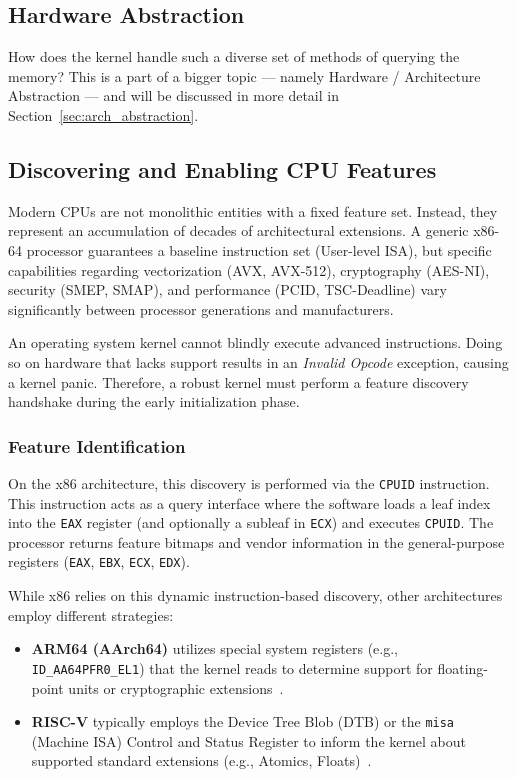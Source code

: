 \documentclass[a4paper,10pt,twoside]{report}
\theoremstyle{definition}
\begin{document}
\subsection{Hardware Abstraction}
How does the kernel handle such a diverse set of methods of querying the memory? This is a part of a bigger topic --- namely Hardware / Architecture Abstraction --- and will be discussed in more detail in Section~\ref{sec:arch_abstraction}.

\subsection{Discovering and Enabling CPU Features}
\label{subsec:cpu_discovery}

Modern CPUs are not monolithic entities with a fixed feature set. Instead, they represent an accumulation of decades of architectural extensions. A generic x86-64 processor guarantees a baseline instruction set (User-level ISA), but specific capabilities regarding vectorization (AVX, AVX-512), cryptography (AES-NI), security (SMEP, SMAP), and performance (PCID, TSC-Deadline) vary significantly between processor generations and manufacturers.
\cite{Intel-AVX}

An operating system kernel cannot blindly execute advanced instructions. Doing so on hardware that lacks support results in an \textit{Invalid Opcode} exception, causing a kernel panic. Therefore, a robust kernel must perform a feature discovery handshake during the early initialization phase.

\subsubsection{Feature Identification}
On the x86 architecture, this discovery is performed via the \texttt{CPUID} instruction. This instruction acts as a query interface where the software loads a leaf index into the \texttt{EAX} register (and optionally a subleaf in \texttt{ECX}) and executes \texttt{CPUID}. The processor returns feature bitmaps and vendor information in the general-purpose registers (\texttt{EAX}, \texttt{EBX}, \texttt{ECX}, \texttt{EDX}).
\cite{Intel-CPUID}

While x86 relies on this dynamic instruction-based discovery, other architectures employ different strategies:
\begin{itemize}
    \item \textbf{ARM64 (AArch64)} utilizes special system registers (e.g., \texttt{ID\_AA64PFR0\_EL1}) that the kernel reads to determine support for floating-point units or cryptographic extensions~\cite{ARM-Arch-Ref}.
    \item \textbf{RISC-V} typically employs the Device Tree Blob (DTB) or the \texttt{misa} (Machine ISA) Control and Status Register to inform the kernel about supported standard extensions (e.g., Atomics, Floats)~\cite{RISCV-Priv-Spec}.
\end{itemize}
\end{document}
